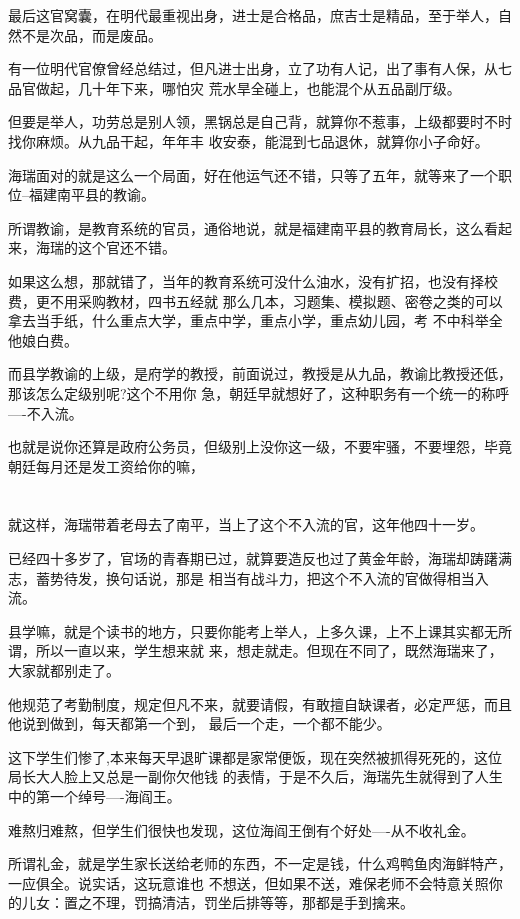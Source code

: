\documentclass[11pt,a4paper,onecolumn]{article}
\begin{document}
最后这官窝囊，在明代最重视出身，进士是合格品，庶吉士是精品，至于举人，自然不是次品，而是废品。

有一位明代官僚曾经总结过，但凡进士出身，立了功有人记，出了事有人保，从七品官做起，几十年下来，哪怕灾
荒水旱全碰上，也能混个从五品副厅级。

但要是举人，功劳总是别人领，黑锅总是自己背，就算你不惹事，上级都要时不时找你麻烦。从九品干起，年年丰
收安泰，能混到七品退休，就算你小子命好。

海瑞面对的就是这么一个局面，好在他运气还不错，只等了五年，就等来了一个职位--福建南平县的教谕。

所谓教谕，是教育系统的官员，通俗地说，就是福建南平县的教育局长，这么看起来，海瑞的这个官还不错。

如果这么想，那就错了，当年的教育系统可没什么油水，没有扩招，也没有择校费，更不用采购教材，四书五经就
那么几本，习题集、模拟题、密卷之类的可以拿去当手纸，什么重点大学，重点中学，重点小学，重点幼儿园，考
不中科举全他娘白费。

而县学教谕的上级，是府学的教授，前面说过，教授是从九品，教谕比教授还低，那该怎么定级别呢?这个不用你
急，朝廷早就想好了，这种职务有一个统一的称呼----不入流。

也就是说你还算是政府公务员，但级别上没你这一级，不要牢骚，不要埋怨，毕竟朝廷每月还是发工资给你的嘛，

\section[\thesection]{}

就这样，海瑞带着老母去了南平，当上了这个不入流的官，这年他四十一岁。

已经四十多岁了，官场的青春期已过，就算要造反也过了黄金年龄，海瑞却踌躇满志，蓄势待发，换句话说，那是
相当有战斗力，把这个不入流的官做得相当入流。

县学嘛，就是个读书的地方，只要你能考上举人，上多久课，上不上课其实都无所谓，所以一直以来，学生想来就
来，想走就走。但现在不同了，既然海瑞来了，大家就都别走了。

他规范了考勤制度，规定但凡不来，就要请假，有敢擅自缺课者，必定严惩，而且他说到做到，每天都第一个到，
最后一个走，一个都不能少。

这下学生们惨了,本来每天早退旷课都是家常便饭，现在突然被抓得死死的，这位局长大人脸上又总是一副你欠他钱
的表情，于是不久后，海瑞先生就得到了人生中的第一个绰号----海阎王。

难熬归难熬，但学生们很快也发现，这位海阎王倒有个好处----从不收礼金。

所谓礼金，就是学生家长送给老师的东西，不一定是钱，什么鸡鸭鱼肉海鲜特产，一应俱全。说实话，这玩意谁也
不想送，但如果不送，难保老师不会特意关照你的儿女：置之不理，罚搞清洁，罚坐后排等等，那都是手到擒来。
\end{document}
